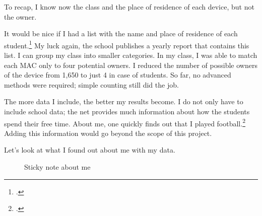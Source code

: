 \documentclass[paper=a4, fontsize=11pt]{article}
\begin{document}
To recap, I know now the class and the place of residence of each device, but not the owner.

It would be nice if I had a list with the name and place of residence of each student.\footcite{jahresbericht2019} My luck again, the school publishes a yearly report that contains this list. I can group my class into smaller categories. In my class, I was able to match each MAC only to four potential owners. I reduced the number of possible owners of the device from 1,650 to just 4 in case of students. So far, no advanced methods were required; simple counting still did the job.

The more data I include, the better my results become. I do not only have to include school data; the net provides much information about how the students spend their free time. About me, one quickly finds out that I played football.\footcite{midlandbouncers} Adding this information would go beyond the scope of this project.

Let's look at what I found out about me with my data.
\begin{figure}
\begin{center}
\end{center}
\caption{Sticky note about me \label{fig:facts}}
\end{figure}
\end{document}
